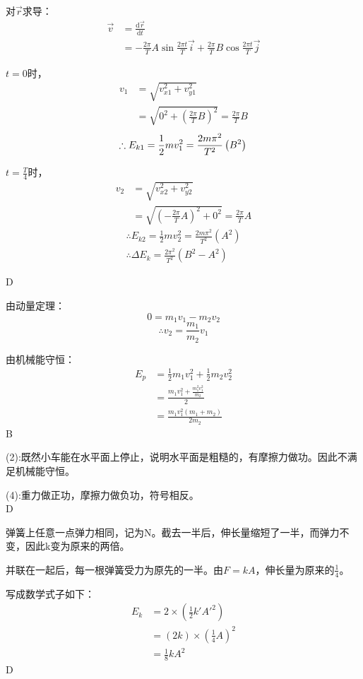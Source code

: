 \documentclass[b5paper,opensource]{./template/qyxf-book}
\newcommand{\di}[1]{\mathrm{d}#1}
\begin{document}
\solve
对$\vec{r}$求导：
\begin{align*}
\vec{v}&=\frac{\di{\vec{r}}}{\di{t}}\\
&=-\frac{2\pi}{T}A\sin\frac{2\pi t}{T}\vec{i}+\frac{2\pi}{T}B\cos\frac{2\pi t}{T}\vec{j}
\end{align*}
\par$t=0$时，
\begin{align*}
v_1&=\sqrt{v_{x1}^2+v_{y1}^2}\\
&=\sqrt{0^2+\left(\frac{2\pi}{T}B\right)^2}=\frac{2\pi}{T}B
\end{align*}
\[\therefore{}E_{k1}=\frac{1}{2}mv_1^2=\frac{2m\pi^2}{T^2}\left(B^2\right)\\\]
\par$t=\frac{T}{4}$时，
\begin{align*}
v_2&=\sqrt{v_{x2}^2+v_{y2}^2}\\
&=\sqrt{\left(-\frac{2\pi}{T}A\right)^2+0^2}=\frac{2\pi}{T}A
\end{align*}
\begin{gather*}
\therefore{}E_{k2}=\frac{1}{2}mv_2^2=\frac{2m\pi^2}{T^2}\left(A^2\right)\\
\therefore\Delta{}E_k=\frac{2\pi^2}{T^2}(B^2-A^2)
\end{gather*}

D

\solve
由动量定理：
\[0=m_1v_1-m_2v_2\]
\[\therefore{}v_2=\frac{m_1}{m_2}v_1\]\par
由机械能守恒：
\begin{align*}
E_p &=\frac{1}{2}m_1v_1^2+\frac{1}{2}m_2v_2^2\\
&=\frac{m_1v_1^2+\frac{m_1^2v_1^2}{m_2}}{2}\\
&=\frac{m_1v_1^2\left(m_1+m_2\right)}{2m_2}
\end{align*}
B

\solve
(2):既然小车能在水平面上停止，说明水平面是粗糙的，有摩擦力做功。因此不满足机械能守恒。\par
(4):重力做正功，摩擦力做负功，符号相反。\\
D

\solve
弹簧上任意一点弹力相同，记为N。截去一半后，伸长量缩短了一半，而弹力不变，因此k变为原来的两倍。\par
并联在一起后，每一根弹簧受力为原先的一半。由$F=kA$，伸长量为原来的$\frac{1}{4}$。\par
写成数学式子如下：
\begin{align*}
E_k &=2\times\left(\frac{1}{2}k'A'^2\right)\\
&=\left(2k\right)\times\left(\frac{1}{4}A\right)^2\\
&=\frac{1}{8}kA^2
\end{align*}
D
\end{document}
